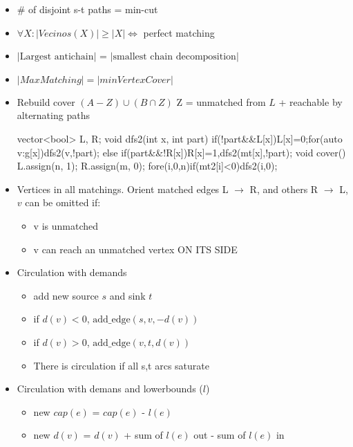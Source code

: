 \begin{itemize}
  \item \# of disjoint s-t paths = min-cut
  \item $\forall X: |Vecinos(X)| \geq |X| \iff$ perfect matching
  \item $|\text{Largest antichain}|$ = $|\text{smallest chain decomposition}|$
  \item $|Max Matching| = |min Vertex Cover|$
  \item Rebuild cover $(A-Z)\cup(B\cap Z)$ Z = unmatched from $L$ + reachable by alternating paths
  \begin{code}
  vector<bool> L, R;
  void dfs2(int x, int part) {
    if(!part&&L[x]){L[x]=0;for(auto v:g[x])dfs2(v,!part);}
    else if(part&&!R[x])R[x]=1,dfs2(mt[x],!part);
  }
  void cover() {L.assign(n, 1); R.assign(m, 0);
    fore(i,0,n)if(mt2[i]<0)dfs2(i,0);
  }\end{code}
  \item Vertices in all matchings. Orient matched edges L $\to$ R, and others R $\to$ L, $v$ can be omitted if:
    \begin{itemize}
      \item v is unmatched
      \item v can reach an unmatched vertex ON ITS SIDE
    \end{itemize}
  \item Circulation with demands
  \begin{itemize}
    \item add new source $s$ and sink $t$
    \item if $d(v) < 0$, $\text{add\_edge}(s, v, -d(v))$
    \item if $d(v) > 0$, $\text{add\_edge}(v, t, d(v))$
    \item There is circulation if all s,t arcs saturate
  \end{itemize}
  \item Circulation with demans and lowerbounds ($l$)
  \begin{itemize}
    \item new $cap(e)$ = $cap(e)$ - $l(e)$
    \item new $d(v)$ = $d(v)$ + sum of $l(e)$ out - sum of $l(e)$ in
  \end{itemize}
\end{itemize}